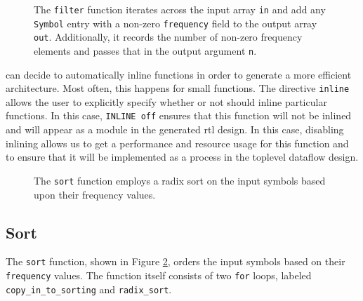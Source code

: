 \begin{figure}

\caption{  The \lstinline{filter} function iterates across the input array \lstinline{in} and add any \lstinline{Symbol} entry with a non-zero \lstinline{frequency} field to the output array \lstinline{out}. Additionally, it records the number of non-zero frequency elements and passes that in the output argument \lstinline{n}.  }
\label{fig:huffman_filter.cpp}
\end{figure}

\begin{aside}
\VHLS can decide to automatically inline functions in order to generate a more efficient architecture. Most often, this happens for small functions.  The directive \lstinline{inline} allows the user to explicitly specify whether or not \VHLS should inline particular functions. In this case, \lstinline{INLINE off} ensures that this function will not be inlined and will appear as a module in the generated \gls{rtl} design. In this case, disabling inlining allows us to get a performance and resource usage for this function and to ensure that it will be implemented as a process in the toplevel dataflow design.
\end{aside}

%

\begin{figure}
{\tiny }
\end{figure}
\begin{figure}
{\tiny }
\caption{  The \lstinline{sort} function employs a radix sort on the input symbols based upon their frequency values. }
\label{fig:huffman_sort.cpp}
\end{figure}

\subsection{Sort}

The \lstinline{sort} function, shown in Figure \ref{fig:huffman_sort.cpp}, orders the input symbols based on their \lstinline{frequency} values. The function itself consists of two \lstinline{for} loops, labeled \lstinline{copy_in_to_sorting} and \lstinline{radix_sort}. 

